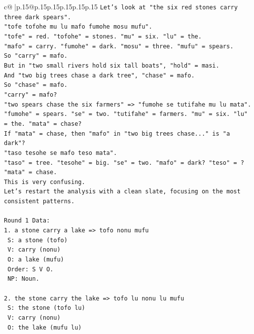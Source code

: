 \documentclass{article}
\begin{document}
{\begin{supertabular}{c@{$\;$}|p{.15\linewidth}@{}p{.15\linewidth}p{.15\linewidth}p{.15\linewidth}p{.15\linewidth}p{.15\linewidth}}
{{{\texttt{Let's look at "the six red stones carry three dark spears".} \\
\texttt{"tofe tofohe mu lu mafo fumohe mosu mufu".} \\
\texttt{"tofe" = red. "tofohe" = stones. "mu" = six. "lu" = the.} \\
\texttt{"mafo" = carry. "fumohe" = dark. "mosu" = three. "mufu" = spears.} \\
\texttt{So "carry" = mafo.} \\
\texttt{But in "two small rivers hold six tall boats", "hold" = masi.} \\
\texttt{And "two big trees chase a dark tree", "chase" = mafo.} \\
\texttt{So "chase" = mafo.} \\
\texttt{"carry" = mafo?} \\
\texttt{"two spears chase the six farmers" => "fumohe se tutifahe mu lu mata".} \\
\texttt{"fumohe" = spears. "se" = two. "tutifahe" = farmers. "mu" = six. "lu" = the. "mata" = chase?} \\
\texttt{If "mata" = chase, then "mafo" in "two big trees chase..." is "a dark"?} \\
\texttt{"taso tesohe se mafo teso mata".} \\
\texttt{"taso" = tree. "tesohe" = big. "se" = two. "mafo" = dark? "teso" = ? "mata" = chase.} \\
\texttt{This is very confusing.} \\
\texttt{Let's restart the analysis with a clean slate, focusing on the most consistent patterns.} \\
\\ 
\texttt{Round 1 Data:} \\
\texttt{1. a stone carry a lake => tofo nonu mufu} \\
\texttt{   S: a stone (tofo)} \\
\texttt{   V: carry (nonu)} \\
\texttt{   O: a lake (mufu)} \\
\texttt{   Order: S V O.} \\
\texttt{   NP: Noun.} \\
\\ 
\texttt{2. the stone carry the lake => tofo lu nonu lu mufu} \\
\texttt{   S: the stone (tofo lu)} \\
\texttt{   V: carry (nonu)} \\
\texttt{   O: the lake (mufu lu)} \\
}}}
\end{supertabular}}
\end{document}
